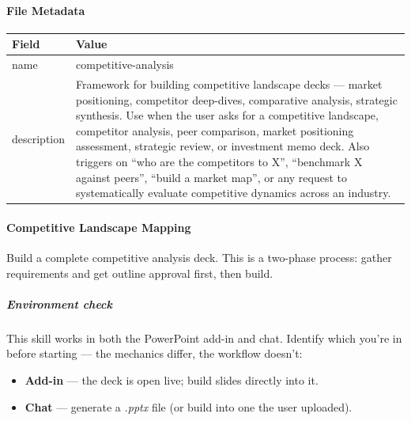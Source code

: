 \documentclass[11pt]{article}
\begin{document}
\paragraph{File Metadata}\mbox{}\par
\begingroup
\small
\setlength{\tabcolsep}{2pt}
\begin{longtable}{>{\RaggedRight\arraybackslash\hspace{0pt}}p{}>{\RaggedRight\arraybackslash\hspace{0pt}}p{}}
\toprule
{} \textbf{Field} & \textbf{Value} \\
\midrule
{} name & competitive-analysis \\
{} description & Framework for building competitive landscape decks — market positioning, competitor deep-dives, comparative analysis, strategic synthesis. Use when the user asks for a competitive landscape, competitor analysis, peer comparison, market positioning assessment, strategic review, or investment memo deck. Also triggers on ``who are the competitors to X'', ``benchmark X against peers'', ``build a market map'', or any request to systematically evaluate competitive dynamics across an industry. \\
\bottomrule
\end{longtable}
\endgroup


\paragraph{Competitive Landscape Mapping}\mbox{}\par

Build a complete competitive analysis deck. This is a two-phase process: gather requirements and get outline approval first, then build.


\subparagraph{Environment check}\mbox{}\par

This skill works in both the PowerPoint add-in and chat. Identify which you're in before starting — the mechanics differ, the workflow doesn't:


\begin{itemize}[leftmargin=*,itemsep=2pt,topsep=2pt]
\item {} \textbf{Add-in} — the deck is open live; build slides directly into it.
\item {} \textbf{Chat} — generate a \emph{.pptx} file (or build into one the user uploaded).
\end{itemize}
\end{document}
